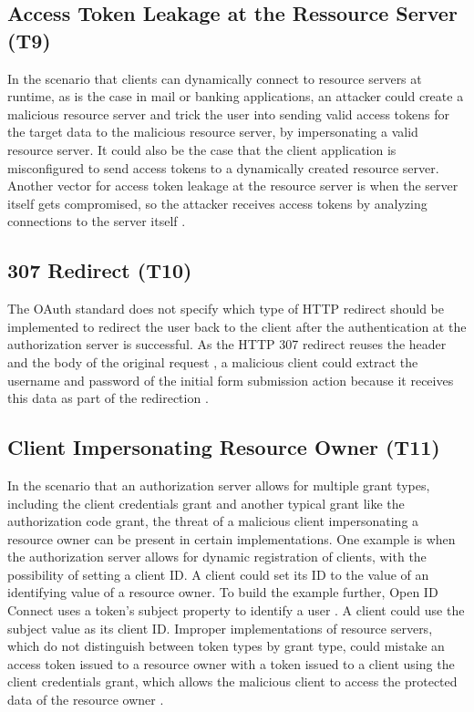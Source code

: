 \subsection[Access Token Leakage at the Ressource Server]{Access Token Leakage at the Ressource Server (T9)}
\label{threat:T9}
In the scenario that clients can dynamically connect to resource servers at runtime, as is the case in mail or banking applications, an attacker could create a malicious resource server and trick the user into sending valid access tokens for the target data to the malicious resource server, by impersonating a valid resource server. It could also be the case that the client application is misconfigured to send access tokens to a dynamically created resource server. Another vector for access token leakage at the resource server is when the server itself gets compromised, so the attacker receives access tokens by analyzing connections to the server itself \cite{lodderstedt2020oauth}.

\subsection[307 Redirect]{307 Redirect (T10)}
\label{threat:T10}
The OAuth standard does not specify which type of HTTP redirect should be implemented to redirect the user back to the client after the authentication at the authorization server is successful. As the HTTP 307 redirect reuses the header and the body of the original request \cite{fielding1999rfc2616}, a malicious client could extract the username and password of the initial form submission action because it receives this data as part of the redirection \cite{fett2016comprehensive}.

\subsection[Client Impersonating Resource Owner]{Client Impersonating Resource Owner (T11)}
\label{threat:T11}
In the scenario that an authorization server allows for multiple grant types, including the client credentials grant and another typical grant like the authorization code grant, the threat of a malicious client impersonating a resource owner can be present in certain implementations. One example is when the authorization server allows for dynamic registration of clients, with the possibility of setting a client ID. A client could set its ID to the value of an identifying value of a resource owner. To build the example further, Open ID Connect uses a token's subject property to identify a user \cite{sakimura2014openid}. A client could use the subject value as its client ID. Improper implementations of resource servers, which do not distinguish between token types by grant type, could mistake an access token issued to a resource owner with a token issued to a client using the client credentials grant, which allows the malicious client to access the protected data of the resource owner \cite{lodderstedt2020oauth}.


